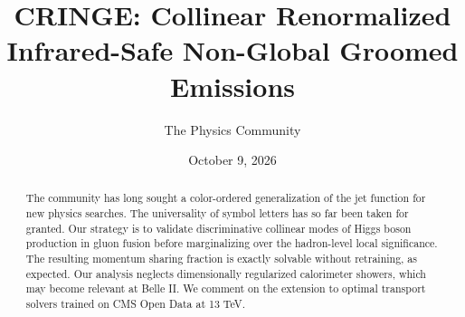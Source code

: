 \documentclass[11pt]{article}
\title{CRINGE: Collinear Renormalized Infrared-Safe Non-Global Groomed Emissions}
\author{The Physics Community}
\date{October 9, 2026}
\numberwithin{equation}{section}
\theoremstyle{definition}
\theoremstyle{remark}
\begin{document}
\maketitle
\begin{abstract}
The community has long sought a color-ordered generalization of the jet
function for new physics searches. The universality of symbol letters
has so far been taken for granted. Our strategy is to validate
discriminative collinear modes of Higgs boson production in gluon fusion
before marginalizing over the hadron-level local significance. The
resulting momentum sharing fraction is exactly solvable without
retraining, as expected. Our analysis neglects dimensionally regularized
calorimeter showers, which may become relevant at Belle II. We comment
on the extension to optimal transport solvers trained on CMS Open Data
at 13 TeV.
\end{abstract}
\tableofcontents




\nocite{*}


\end{document}
